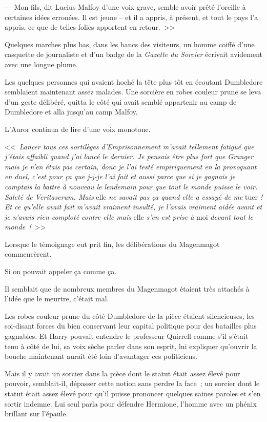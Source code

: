 --- Mon fils, dit Lucius Malfoy d'une voix grave, semble avoir prêté l'oreille à certaines idées erronées. Il est jeune -- et il a appris, à présent, et tout le pays l'a appris, ce que de telles folies apportent en retour.~>>

Quelques marches plus bas, dans les bancs des visiteurs, un homme coiffé d'une casquette de journaliste et d'un badge de la \emph{Gazette du Sorcier} écrivait avidement avec une longue plume.

Les quelques personnes qui avaient hoché la tête plus tôt en écoutant Dumbledore semblaient maintenant assez malades. Une sorcière en robes couleur prune se leva d'un geste délibéré, quitta le côté qui avait semblé appartenir au camp de Dumbledore et alla jusqu'au camp Malfoy.

L'Auror continua de lire d'une voix monotone.

<<~\emph{Lancer tous ces sortilèges d'Emprisonnement m'avait tellement fatigué que j'étais affaibli quand j'ai lancé le dernier. Je pensais être plus fort que Granger mais je n'en étais pas certain, donc je l'ai testé empiriquement en la provoquant en duel, c'est pour ça que j-j-je l'ai fait et aussi parce que si je gagnais je comptais la battre à nouveau le lendemain pour que tout le monde puisse le voir. Saleté de Veritaserum. Mais} elle \emph{ne savait pas ça quand elle a essayé de me} tuer \emph{! Et ce qu'elle avait fait m'avait vraiment insulté, je l'avais vraiment aidée avant et je n'avais rien comploté contre elle mais} elle \emph{s'en est prise à} moi \emph{devant tout le monde~!}~>>

Lorsque le témoignage eut prit fin, les délibérations du Magenmagot commencèrent.

Si on pouvait appeler ça comme ça.

Il semblait que de nombreux membres du Magenmagot étaient très attachés à l'idée que le meurtre, c'était mal.

Les robes couleur prune du côté Dumbledore de la pièce étaient silencieuses, les soi-disant forces du bien conservant leur capital politique pour des batailles plus gagnables. Et Harry pouvait entendre le professeur Quirrell comme s'il s'était tenu à côté de lui, sa voix sèche parler dans son esprit, lui expliquer qu'ouvrir la bouche maintenant aurait été loin d'avantager ces politiciens.

Mais il y avait un sorcier dans la pièce dont le statut était assez élevé pour pouvoir, semblait-il, dépasser cette notion sans perdre la face~; un sorcier dont le statut était assez élevé pour qu'il puisse prononcer quelques saines paroles et s'en sortir indemne. Lui seul parla pour défendre Hermione, l'homme avec un phénix brillant sur l'épaule.

